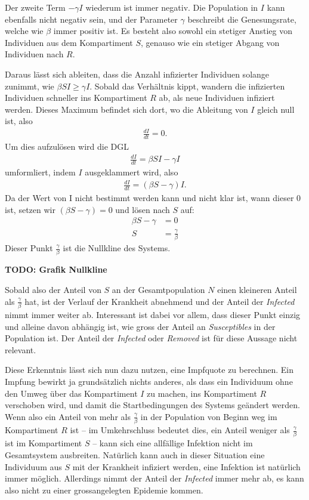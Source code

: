 \begin{refsection}
Der zweite Term $- \gamma I$ wiederum ist immer negativ. 
Die Population in $I$ kann ebenfalls nicht negativ sein, und der Parameter $\gamma$ beschreibt die Genesungsrate, welche wie $\beta$ immer positiv ist.
Es besteht also sowohl ein stetiger Anstieg von Individuen aus dem Kompartiment $S$, genauso wie ein stetiger Abgang von Individuen nach $R$.

Daraus lässt sich ableiten, dass die Anzahl infizierter Individuen solange zunimmt, wie $\beta S I \ge \gamma I$. Sobald das Verhältnis kippt, wandern die infizierten Individuen schneller ins Kompartiment $R$ ab, als neue Individuen infiziert werden.
Dieses Maximum befindet sich dort, wo die Ableitung von $I$ gleich null ist, also
\begin{align*}
  \frac{dI}{dt} = 0.
\end{align*}
Um dies aufzulösen wird die DGL 
\begin{align*}
  \frac{dI}{dt} = \beta S I - \gamma I
\end{align*}
umformliert, indem $I$ ausgeklammert wird, also
\begin{align*}
  \frac{dI}{dt} = \left(\beta S - \gamma \right) I.
\end{align*}
Da der Wert von I nicht bestimmt werden kann und nicht klar ist, wann dieser 0 ist, setzen wir $\left(\beta S - \gamma \right) = 0$ und lösen nach $S$ auf:
\begin{align*}
  \beta S - \gamma &= 0 \\
  S &= \frac{\gamma}{\beta}
\end{align*}
Dieser Punkt $\frac{\gamma}{\beta}$ ist die Nullkline des Systems. 

\textbf{TODO: Grafik Nullkline}

Sobald also der Anteil von $S$ an der Gesamtpopulation $N$ einen kleineren Anteil als $\frac{\gamma}{\beta}$ hat, ist der Verlauf der Krankheit abnehmend und der Anteil der \emph{Infected} nimmt immer weiter ab.
Interessant ist dabei vor allem, dass dieser Punkt einzig und alleine davon abhängig ist, wie gross der Anteil an \emph{Susceptibles} in der Population ist. 
Der Anteil der \emph{Infected} oder \emph{Removed} ist für diese Aussage nicht relevant. 

Diese Erkenntnis lässt sich nun dazu nutzen, eine Impfquote zu berechnen. 
Ein Impfung bewirkt ja grundsätzlich nichts anderes, als dass ein Individuum ohne den Umweg über das Kompartiment $I$ zu machen, ins Kompartiment $R$ verschoben wird, und damit die Startbedingungen des Systems geändert werden.
Wenn also ein Anteil von mehr als $\frac{\gamma}{\beta}$ in der Population von Beginn weg im Kompartiment $R$ ist -- im Umkehrschluss bedeutet dies, ein Anteil weniger als $\frac{\gamma}{\beta}$ ist im Kompartiment $S$ -- kann sich eine allfällige Infektion nicht im Gesamtsystem ausbreiten.
Natürlich kann auch in dieser Situation eine Individuum aus $S$ mit der Krankheit infiziert werden, eine Infektion ist natürlich immer möglich. 
Allerdings nimmt der Anteil der \emph{Infected} immer mehr ab, es kann also nicht zu einer grossangelegten Epidemie kommen.


\end{refsection}
